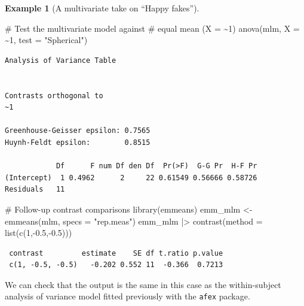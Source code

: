 \documentclass[
  11pt,
  letterpaper,
]{scrbook}
\newenvironment{Shaded}{\begin{snugshade}}{\end{snugshade}}
\newcommand{\AttributeTok}[1]{\textcolor[rgb]{0.40,0.45,0.13}{#1}}
\newcommand{\CommentTok}[1]{\textcolor[rgb]{0.37,0.37,0.37}{#1}}
\newcommand{\DecValTok}[1]{\textcolor[rgb]{0.68,0.00,0.00}{#1}}
\newcommand{\FloatTok}[1]{\textcolor[rgb]{0.68,0.00,0.00}{#1}}
\newcommand{\FunctionTok}[1]{\textcolor[rgb]{0.28,0.35,0.67}{#1}}
\newcommand{\NormalTok}[1]{\textcolor[rgb]{0.00,0.23,0.31}{#1}}
\newcommand{\OtherTok}[1]{\textcolor[rgb]{0.00,0.23,0.31}{#1}}
\newcommand{\SpecialCharTok}[1]{\textcolor[rgb]{0.37,0.37,0.37}{#1}}
\newcommand{\StringTok}[1]{\textcolor[rgb]{0.13,0.47,0.30}{#1}}
\theoremstyle{definition}
\newtheorem{example}{Example}[chapter]
\theoremstyle{remark}
\begin{document}
\begin{example}[A multivariate take on ``Happy
fakes'']
\begin{Shaded}
\begin{Highlighting}[]
\CommentTok{\# Test the multivariate model against}
\CommentTok{\# equal mean (X = \textasciitilde{}1)}
\FunctionTok{anova}\NormalTok{(mlm, }\AttributeTok{X =} \SpecialCharTok{\textasciitilde{}}\DecValTok{1}\NormalTok{, }\AttributeTok{test =} \StringTok{"Spherical"}\NormalTok{)}
\end{Highlighting}
\end{Shaded}

\begin{verbatim}
Analysis of Variance Table


Contrasts orthogonal to
~1

Greenhouse-Geisser epsilon: 0.7565
Huynh-Feldt epsilon:        0.8515

            Df      F num Df den Df  Pr(>F)  G-G Pr  H-F Pr
(Intercept)  1 0.4962      2     22 0.61549 0.56666 0.58726
Residuals   11                                             
\end{verbatim}

\begin{Shaded}
\begin{Highlighting}[]
\CommentTok{\# Follow{-}up contrast comparisons}
\FunctionTok{library}\NormalTok{(emmeans)}
\NormalTok{emm\_mlm }\OtherTok{\textless{}{-}} \FunctionTok{emmeans}\NormalTok{(mlm, }\AttributeTok{specs =} \StringTok{"rep.meas"}\NormalTok{) }
\NormalTok{emm\_mlm }\SpecialCharTok{|\textgreater{}} \FunctionTok{contrast}\NormalTok{(}\AttributeTok{method =} \FunctionTok{list}\NormalTok{(}\FunctionTok{c}\NormalTok{(}\DecValTok{1}\NormalTok{,}\SpecialCharTok{{-}}\FloatTok{0.5}\NormalTok{,}\SpecialCharTok{{-}}\FloatTok{0.5}\NormalTok{)))}
\end{Highlighting}
\end{Shaded}

\begin{verbatim}
 contrast         estimate    SE df t.ratio p.value
 c(1, -0.5, -0.5)   -0.202 0.552 11  -0.366  0.7213
\end{verbatim}

We can check that the output is the same in this case as the
within-subject analysis of variance model fitted previously with the
\texttt{afex} package.

\end{example}
\end{document}
